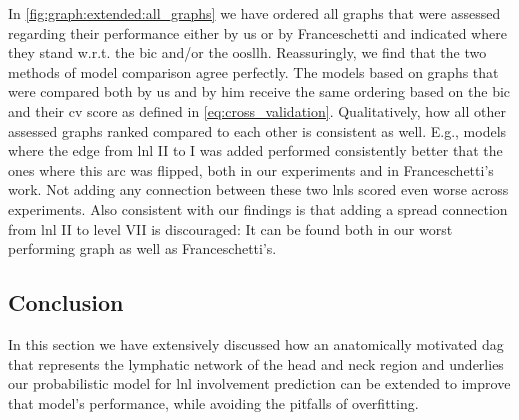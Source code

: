 \documentclass[\relativeRoot/main.tex]{subfiles}
\begin{document}
In \cref{fig:graph:extended:all_graphs} we have ordered all graphs that were assessed regarding their performance either by us or by Franceschetti \cite{franceschetti_comparison_2022} and indicated where they stand w.r.t. the \gls{bic} and/or the $\text{oosllh}$. Reassuringly, we find that the two methods of model comparison agree perfectly. The models based on graphs that were compared both by us and by him receive the same ordering based on the \gls{bic} and their \gls{cv} score as defined in \cref{eq:cross_validation}. Qualitatively, how all other assessed graphs ranked compared to each other is consistent as well. E.g., models where the edge from \gls{lnl} II to I was added performed consistently better that the ones where this arc was flipped, both in our experiments and in Franceschetti's work. Not adding any connection between these two \glspl{lnl} scored even worse across experiments. Also consistent with our findings is that adding a spread connection from \gls{lnl} II to level VII is discouraged: It can be found both in our worst performing graph as well as Franceschetti's.

\begin{sidewaysfigure}
    \centering
    \def\svgwidth{0.8\textwidth}
    
    \caption[
        All investigated graphs ordered by their performances
    ]{
        Schematics of all investigated graphs modelling the \glspl{lnl} I, II, III, IV, V and VII. The axis at the top indicates the graph's performance w.r.t. the \gls{bic}, while the axis on the bottom shows the $\text{oosllh}$, which was investigated by Franceschetti \cite{franceschetti_comparison_2022}, who only considered graphs adding two connections to the base graph. For both metrics larger values (further to the right) indicate a better performance.
    }
    \label{fig:graph:extended:all_graphs}
\end{sidewaysfigure}

\subsection{Conclusion}
\label{subsec:graph:extended:conclusion}

In this section we have extensively discussed how an anatomically motivated \gls{dag} that represents the lymphatic network of the head and neck region and underlies our probabilistic model for \gls{lnl} involvement prediction can be extended to improve that model's performance, while avoiding the pitfalls of overfitting.
\end{document}
